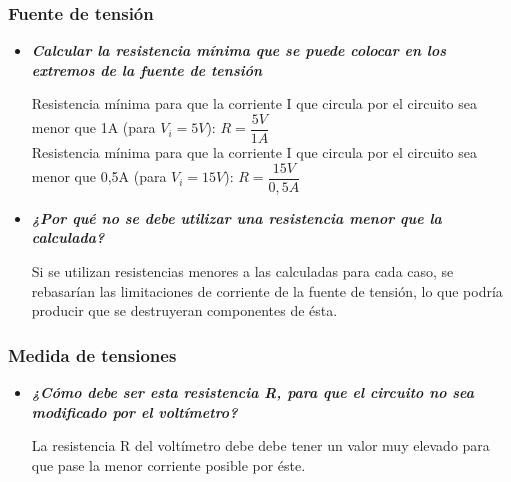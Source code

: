 	\subsubsection{Fuente de tensión}
		\begin{itemize}
			\item \textbf{\textit{Calcular la resistencia mínima que se puede colocar en los extremos de la fuente de tensión}}
			
			Resistencia mínima para que la corriente I que circula por el circuito sea menor que 1A (para $ V_{i}=5V $):			
			$ R = \dfrac{5V}{1A} \hspace{4pt} $ {\fboxrule=1pt \fboxsep=6pt
				}
			\\
			
			Resistencia mínima para que la corriente I que circula por el circuito sea menor que 0,5A (para $ V_{i}=15V $):			
			$ R = \dfrac{15V}{0,5A} \hspace{4pt} $ {\fboxrule=1pt \fboxsep=6pt
				}
			
			\item \textbf{\textit{¿Por qué no se debe utilizar una resistencia menor que la calculada?}}
			
			Si se utilizan resistencias menores a las calculadas para cada caso, se rebasarían las limitaciones de corriente de la fuente de tensión, lo que podría producir que se destruyeran componentes de ésta.
		\end{itemize}
	
	\subsubsection{Medida de tensiones}
		\begin{itemize}
			\item \textbf{\textit{¿Cómo debe ser esta resistencia R, para que el circuito no sea modificado por el voltímetro?}}
			
			La resistencia R del voltímetro debe debe tener un valor muy elevado
			para que pase la menor corriente posible por éste.
		\end{itemize}
	
